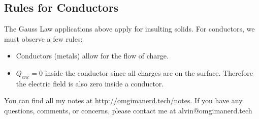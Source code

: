 \documentclass{math}
\begin{document}
\subsection*{Rules for Conductors}
The Gauss Law applications above apply for insulting solids. For conductors, we
must observe a few rules:
\begin{itemize}
  \item Conductors (metals) allow for the flow of charge.
  \item \( Q_{enc} = 0 \) inside the conductor since all charges are on the
  surface. Therefore the electric field is also zero inside a conductor.
\end{itemize}

\begin{center}
  You can find all my notes at \url{http://omgimanerd.tech/notes}. If you have
  any questions, comments, or concerns, please contact me at
  alvin@omgimanerd.tech
\end{center}
\end{document}
